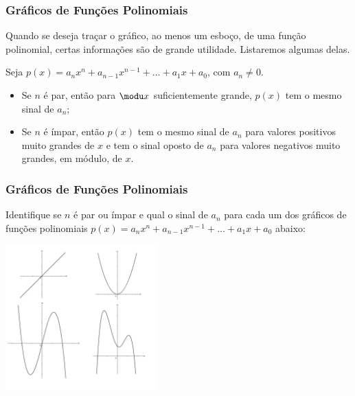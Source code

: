     
    \begin{frame}
    \frametitle{Gráficos de Funções Polinomiais} 
    Quando se deseja traçar o gráfico, ao menos um esboço, de uma função
    polinomial, certas informações são de grande utilidade. Listaremos
    algumas delas.
    
    Seja $p(x) = a_n x^n+ a_{n-1} x^{n-1} + \dots + a_1x + a_0$, com
    $a_n \neq 0$.
    \begin{itemize}
        \item Se $n$ é par, então para $\modu x $ suficientemente grande,
        $p(x)$ tem o mesmo sinal de $a_n$;
        \item Se $n$ é ímpar, então $p(x)$ tem o mesmo sinal de $a_n$ para
        valores positivos  muito grandes de $x$ e tem o sinal oposto de
        $a_n$ para valores negativos muito grandes, em módulo, de $x$.
    \end{itemize}
    
    \end{frame}
    
    \begin{frame}
    \frametitle{Gráficos de Funções Polinomiais} 
    \begin{exemplo}
    Identifique se $n$ é par ou ímpar e qual o sinal de $a_n$ para cada
    um dos gráficos de funções polinomiais $p(x) = a_n x^n+ a_{n-1}
    x^{n-1} + \dots + a_1x + a_0$ abaixo:
    
    \begin{center}
    \includegraphics[width=5.8cm]{figures/4graf.jpg}
    \end{center}
    \end{exemplo}
    
    \end{frame}
    
